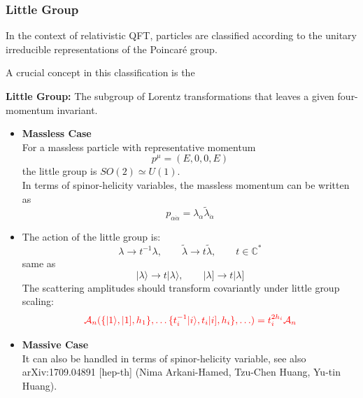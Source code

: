 \documentclass{beamer}
\newcommand{\aket}[1]{|#1\rangle}
\newcommand{\sket}[1]{|#1]}
\begin{document}
\begin{frame}
\frametitle{Little Group}
    In the context of relativistic QFT, particles are classified according to the unitary irreducible representations of the Poincaré group.

    A crucial concept in this classification is the 
    \begin{tcolorbox}[thickitembox]
        \textbf{Little Group:} The subgroup of Lorentz transformations that leaves a given four-momentum invariant.
    \end{tcolorbox}
    \begin{itemize}
        \item \textbf{Massless Case}\\
        For a massless particle with representative momentum 
        \begin{equation*}
            p^\mu=(E,0,0,E)
        \end{equation*}
        the little group is $SO(2)\simeq U(1)$.\\
        In terms of spinor-helicity variables, the massless momentum can be written as
        \begin{equation*}
            p_{\alpha \dot{\alpha}}=\lambda_\alpha \tilde{\lambda}_{\dot{\alpha}}
        \end{equation*}
    \end{itemize}
\end{frame}

\begin{frame}
    \begin{itemize}
        \item[] The action of the little group is:
        \begin{equation*}
            \lambda \rightarrow t^{-1}\lambda, \qquad \tilde{\lambda}\rightarrow t\tilde{\lambda}, \qquad t\in\mathbb{C^*} 
        \end{equation*}
        same as 
        \begin{equation*}
            \aket{\lambda}\rightarrow t\aket{\lambda}, \qquad \sket{\lambda}\rightarrow t\sket{\lambda}
        \end{equation*}
        The scattering amplitudes should transform covariantly under little group scaling:
        \begin{equation*}
            \color{red} \mathcal{A}_n(\{\aket{1},\sket{1},h_1\},\ldots\{t_i^{-1}\aket{i},t_i\sket{i},h_i\},\ldots )=t_i^{2h_i}\mathcal{A}_n
        \end{equation*}
        \item \textbf{Massive Case}\\
        It can also be handled in terms of spinor-helicity variable, see also 	arXiv:1709.04891 [hep-th] (Nima Arkani-Hamed, Tzu-Chen Huang, Yu-tin Huang).
    \end{itemize}
\end{frame}
\end{document}
